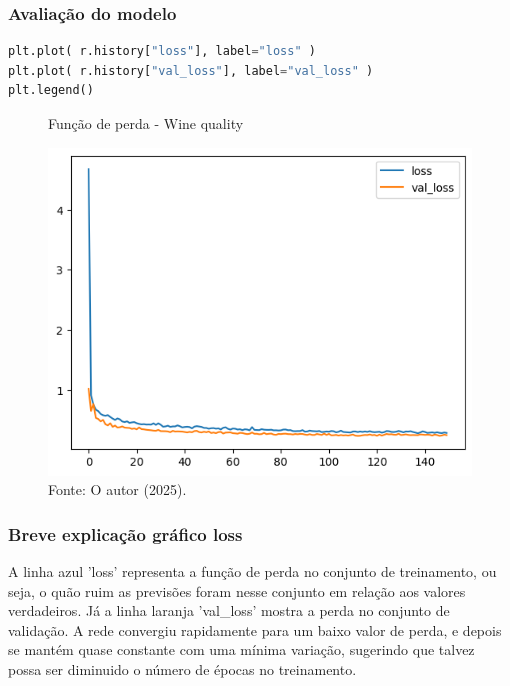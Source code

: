\subsubsection*{Avaliação do modelo}
\begin{lstlisting}[language=Python, style=input]
plt.plot( r.history["loss"], label="loss" )
plt.plot( r.history["val_loss"], label="val_loss" )
plt.legend()
\end{lstlisting}
\begin{figure}[H]
\centering
\caption{Função de perda - Wine quality}
\includegraphics[width=.8\linewidth]{apendices/fig/13_IAA012_6.png}
\caption*{Fonte: O autor (2025).}
\end{figure}
\subsubsection*{Breve explicação gráfico loss}
A linha azul 'loss' representa a função de perda no conjunto de treinamento, ou seja, o quão ruim as previsões foram nesse conjunto em relação aos valores verdadeiros. Já a linha laranja 'val\_loss' mostra a perda no conjunto de validação. A rede convergiu rapidamente para um baixo valor de perda, e depois se mantém quase constante com uma mínima variação, sugerindo que talvez possa ser diminuido o número de épocas no treinamento.


